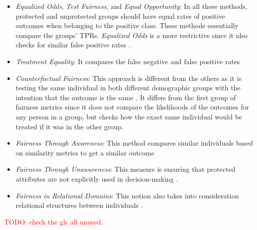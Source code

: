 \documentclass[12pt, a4paper, oneside]{book}   	%
\renewcommand{\todo}[1]{\textcolor{red}{TODO: #1}}
\begin{document}
\begin{appendices}
\begin{itemize}
				\item \textit{Equalized Odds}, \textit{Test Fairness}, and \textit{Equal Opportunity}: In all these methods, protected and unprotected groups should have equal rates of positive outcomes when belonging to the positive class. These methods essentially compare the groups' \glspl{TPR}. \textit{Equalized Odds} is a more restrictive since it also checks for similar false positive rates \autocites{M149_Verma_2018}{Mehrabi_2021}.
				
				\item \textit{Treatment Equality}: It compares the false negative and false positive rates \autocite{M151_Wang_2014}
				
				\item \textit{Counterfactual Fairness}: This approach is different from the others as it is testing the same individual in both different demographic groups with the intention that the outcome is the same \autocites{M87_Kusner_2017}{Mehrabi_2021}. It differs from the first group of fairness metrics since it does not compare the likelihoods of the outcomes for any person in a group, but checks how the exact same individual would be treated if it was in the other group.
				
				\item \textit{Fairness Through Awareness}: This method compares similar individuals based on similarity metrics to get a similar outcome \autocites{M48_Dwork_2012}{Mehrabi_2021}
				
				\item \textit{Fairness Through Unawareness}: This measure is ensuring that protected attributes are not explicitly used in decision-making \autocite{M61_Grgic-Hlaca_2016, M87_Kusner_2017}.
				
				\item \textit{Fairness in Relational Domains}: This notion also takes into consideration relational structures between individuals \autocite{M50_Farnadi_2018}.
			\end{itemize}
			
		\end{appendices}
		
		
		
			
		\glsaddallunused                                %
		\todo{check the gls all unused.}
		
	
\end{document}
